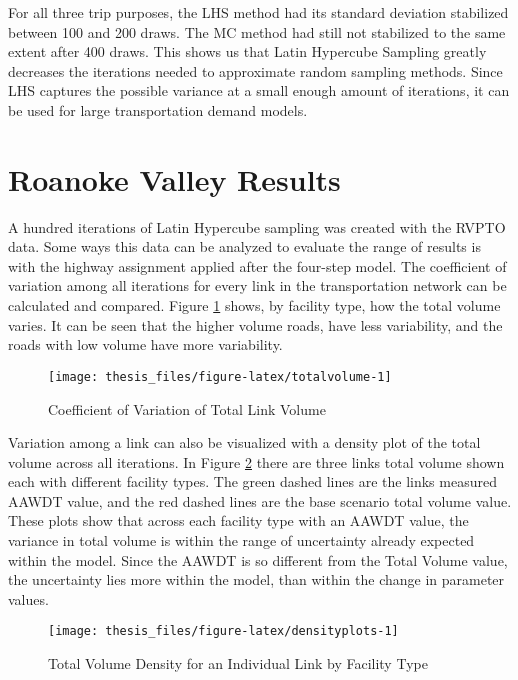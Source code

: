 \documentclass[fancy, masters,twoside]{byuthesis}
\begin{document}
For all three trip purposes, the LHS method had its standard deviation stabilized between 100 and 200 draws. The MC method had still not stabilized to the same extent after 400 draws. This shows us that Latin Hypercube Sampling greatly decreases the iterations needed to approximate random sampling methods. Since LHS captures the possible variance at a small enough amount of iterations, it can be used for large transportation demand models.

\hypertarget{roanoke-valley-results}{%
\section{Roanoke Valley Results}\label{roanoke-valley-results}}

A hundred iterations of Latin Hypercube sampling was created with the RVPTO data. Some ways this data can be analyzed to evaluate the range of results is with the highway assignment applied after the four-step model. The coefficient of variation among all iterations for every link in the transportation network can be calculated and compared. Figure \ref{fig:totalvolume} shows, by facility type, how the total volume varies. It can be seen that the higher volume roads, have less variability, and the roads with low volume have more variability.

\begin{figure}

{\centering \texttt{[image: thesis\_files/figure-latex/totalvolume-1]} 

}

\caption{Coefficient of Variation of Total Link Volume}\label{fig:totalvolume}
\end{figure}

Variation among a link can also be visualized with a density plot of the total volume across all iterations. In Figure \ref{fig:densityplots} there are three links total volume shown each with different facility types. The green dashed lines are the links measured AAWDT value, and the red dashed lines are the base scenario total volume value. These plots show that across each facility type with an AAWDT value, the variance in total volume is within the range of uncertainty already expected within the model. Since the AAWDT is so different from the Total Volume value, the uncertainty lies more within the model, than within the change in parameter values.

\begin{figure}

{\centering \texttt{[image: thesis\_files/figure-latex/densityplots-1]} 

}

\caption{Total Volume Density for an Individual Link by Facility Type}\label{fig:densityplots}
\end{figure}
\end{document}
